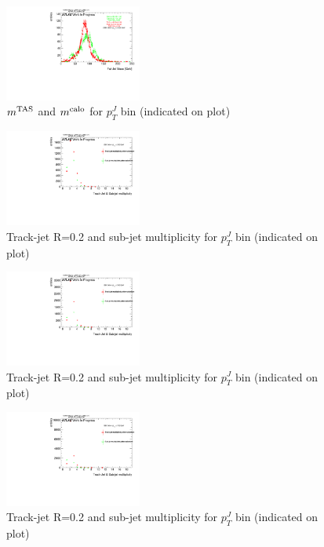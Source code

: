 \begin{figure}
 
\includegraphics[width=0.4\textwidth]{appendixB/mTAS_W_calibmCal_20:07:01-03-11-2016/12cfrt_h_FatJet_ptJ12m.pdf}
\caption{$m^\textrm{TAS}$ and $m^\textrm{calo}$ for $p_{T}^{J}$ bin (indicated on plot) }
 
\end{figure}
\clearpage %
\begin{figure}
 
\includegraphics[width=0.4\textwidth]{appendixB/mTAS_W_calibmCal_20:07:01-03-11-2016/13cfrt_h_SubJet_aftersel_ptJ01TAmult.pdf}
\caption{Track-jet R=0.2 and sub-jet multiplicity for $p_{T}^{J}$ bin (indicated on plot) }
 
\end{figure}
 
\begin{figure}
 
\includegraphics[width=0.4\textwidth]{appendixB/mTAS_W_calibmCal_20:07:01-03-11-2016/13cfrt_h_SubJet_aftersel_ptJ02TAmult.pdf}
\caption{Track-jet R=0.2 and sub-jet multiplicity for $p_{T}^{J}$ bin (indicated on plot) }
 
\end{figure}
 
\begin{figure}
 
\includegraphics[width=0.4\textwidth]{appendixB/mTAS_W_calibmCal_20:07:01-03-11-2016/13cfrt_h_SubJet_aftersel_ptJ03TAmult.pdf}
\caption{Track-jet R=0.2 and sub-jet multiplicity for $p_{T}^{J}$ bin (indicated on plot) }
 
\end{figure}
 
